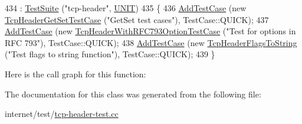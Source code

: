\begin{DoxyCode}
434     : \hyperlink{classns3_1_1TestSuite_a904b0c40583b744d30908aeb94636d1a}{TestSuite} (\textcolor{stringliteral}{"tcp-header"}, \hyperlink{classns3_1_1TestSuite_a1ebfcab34ec8161e085e8e3a1855eae0a3885375a3787abf60431f8454b3cadbd}{UNIT})
435   \{
436     \hyperlink{classns3_1_1TestCase_a3718088e3eefd5d6454569d2e0ddd835}{AddTestCase} (\textcolor{keyword}{new} \hyperlink{classTcpHeaderGetSetTestCase}{TcpHeaderGetSetTestCase} (\textcolor{stringliteral}{"GetSet test cases"}), 
      TestCase::QUICK);
437     \hyperlink{classns3_1_1TestCase_a3718088e3eefd5d6454569d2e0ddd835}{AddTestCase} (\textcolor{keyword}{new} \hyperlink{classTcpHeaderWithRFC793OptionTestCase}{TcpHeaderWithRFC793OptionTestCase} (\textcolor{stringliteral}{"Test
       for options in RFC 793"}), TestCase::QUICK);
438     \hyperlink{classns3_1_1TestCase_a3718088e3eefd5d6454569d2e0ddd835}{AddTestCase} (\textcolor{keyword}{new} \hyperlink{classTcpHeaderFlagsToString}{TcpHeaderFlagsToString} (\textcolor{stringliteral}{"Test flags to string
       function"}), TestCase::QUICK);
439   \}
\end{DoxyCode}


Here is the call graph for this function\+:




The documentation for this class was generated from the following file\+:\begin{DoxyCompactItemize}
\item 
internet/test/\hyperlink{tcp-header-test_8cc}{tcp-\/header-\/test.\+cc}\end{DoxyCompactItemize}
